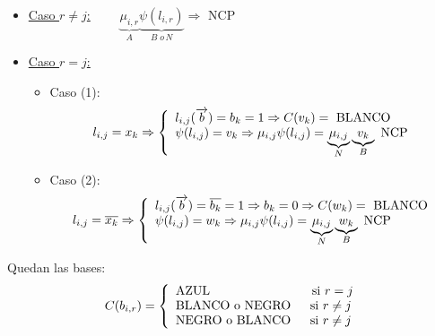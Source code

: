 \documentclass[12pt,a4paper]{report}
\newcounter{neq}
\begin{document}
  				\begin{itemize}
  					\item \underline{Caso $r \neq j$:} $\qquad \underbrace{\mu_{i, r}}_{A} \underbrace{\psi(l_{i, r})}_{B \; o \, N} \Rightarrow$ NCP
  					\item \underline{Caso $r = j$:}
  						\begin{itemize}
  							\item Caso (1):
  								\begin{equation*}
  									l_{i, j} = x_{k} \Rightarrow
  		  							\left\lbrace
  									\begin{array}{l}
  	  		 							l_{i, j}(\overrightarrow{b}) = b_{k} = 1 \Rightarrow C(v_{k}) = \textup{ BLANCO} \\
  	  		 							\psi(l_{i, j}) = v_{k}	\Rightarrow \mu_{i, j} \psi(l_{i, j}) = \underbrace{\mu_{i, j}}_{N} \underbrace{v_{k}}_{B} \textup{ NCP}
  									\end{array}
  									\right.
  								\end{equation*}

  							\item Caso (2):
  								\begin{equation*}
  									l_{i, j} = \overline{x_{k}} \Rightarrow
  		  							\left\lbrace
  									\begin{array}{l}
  	  		 							l_{i, j}(\overrightarrow{b}) = \overline{b_{k}} = 1 \Rightarrow b_{k} = 0 \Rightarrow C(w_{k}) = \textup{ BLANCO} \\
  										\psi(l_{i, j}) = w_{k}	\Rightarrow \mu_{i, j} \psi(l_{i, j}) = \underbrace{\mu_{i, j}}_{N} \underbrace{w_{k}}_{B} \textup{ NCP}
  									\end{array}
  									\right.
  								\end{equation*}
  						\end{itemize}
  				\end{itemize}

  				\par Quedan las bases:
  				\begin{equation*}
  					C(b_{i, r}) =
  				  \left\lbrace
  		  		\begin{array}{l}
  		    		\textup{AZUL \qquad \qquad\qquad \; \; \; si } r = j \\
  		    		\textup{BLANCO o NEGRO \; \; si } r \neq j \\
  		    		\textup{NEGRO o BLANCO \; \; si } r \neq j
  		  		\end{array}
  		 			\right.
  				\end{equation*}
\end{document}
